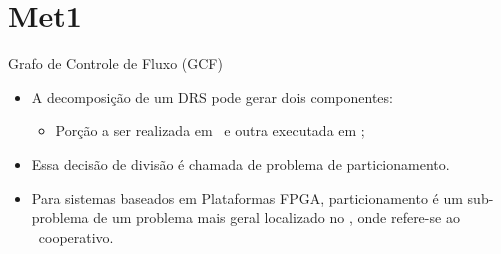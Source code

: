 \section{Met1}


\begin{frame}{Grafo de Controle de Fluxo (GCF)}
\begin{itemize}
   \setlength{\itemsep}{1.6em}
   \item A decomposição de um DRS pode gerar dois componentes:
   \begin{itemize}
      \item Porção a ser realizada em \hardware\ e outra executada em \software;
   \end{itemize}
   
   \item Essa decisão de divisão é chamada de problema de particionamento.
   
   \item Para sistemas baseados em Plataformas FPGA, particionamento é um sub-problema de um problema mais geral localizado no \codesign, onde refere-se ao \design\ cooperativo.
\end{itemize}
\end{frame}

